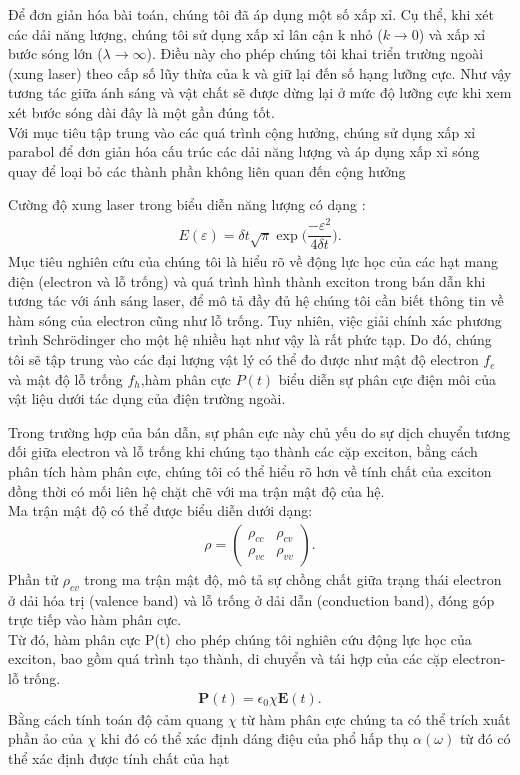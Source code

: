 \documentclass[%
 reprint,
 amsmath,amssymb,
 aps,
]{revtex4-2}
\begin{document}
Để đơn giản hóa bài toán, chúng tôi đã áp dụng một số xấp xỉ. Cụ thể, khi xét các dải năng lượng, chúng tôi sử dụng xấp xỉ lân cận k nhỏ ($k\rightarrow 0$) và xấp xỉ bước sóng lớn ($\lambda\rightarrow\infty$). Điều này cho phép chúng tôi khai triển trường ngoài (xung laser) theo cấp số lũy thừa của k và giữ lại đến số hạng lưỡng cực. Như vậy tương tác giữa ánh sáng và vật chất sẽ được dừng lại ở mức độ lưỡng cực khi xem xét bước sóng dài đây là một gần đúng tốt.\\
Với mục tiêu tập trung vào các quá trình cộng hưởng, chúng sử dụng xấp xỉ parabol để đơn giản hóa cấu trúc các dải năng lượng và áp dụng xấp xỉ sóng quay để loại bỏ các thành phần không liên quan đến cộng hưởng 

Cường độ xung laser trong biểu diễn năng lượng có dạng :
\begin{align}
	E(\varepsilon)=\delta t\sqrt{\pi}\exp{\bigg(\dfrac{-\varepsilon^2}{4\delta t}\bigg)}.
\end{align}
Mục tiêu nghiên cứu của chúng tôi là hiểu rõ về động lực học của các hạt mang điện (electron và lỗ trống) và quá trình hình thành exciton trong bán dẫn khi tương tác với ánh sáng laser, để mô tả đầy đủ hệ chúng tôi cần biết thông tin về hàm sóng của electron cũng như lỗ trống. Tuy nhiên, việc giải chính xác phương trình Schrödinger cho một hệ nhiều hạt như vậy là rất phức tạp. Do đó, chúng tôi sẽ tập trung vào các đại lượng vật lý có thể đo được như mật độ electron $f_e$ và mật độ lỗ trống $f_h$,hàm phân cực $P(t)$  biểu diễn sự phân cực điện môi của vật liệu dưới tác dụng của điện trường ngoài.

Trong trường hợp của bán dẫn, sự phân cực này chủ yếu do sự dịch chuyển tương đối giữa electron và lỗ trống khi chúng tạo thành các cặp exciton, bằng cách phân tích hàm phân cực, chúng tôi có thể hiểu rõ hơn về tính chất của exciton đồng thời có mối liên hệ chặt chẽ với ma trận mật độ của hệ.\\
Ma trận mật độ có thể được biểu diễn dưới dạng:
\begin{align*}
	\rho = \begin{pmatrix}
		\rho_{cc} & \rho_{cv} \\
		\rho_{vc} & \rho_{vv}
	\end{pmatrix} .
\end{align*}
Phần tử $\rho_{cv}$ trong ma trận mật độ, mô tả sự chồng chất giữa trạng thái electron ở dải hóa trị (valence band) và lỗ trống ở dải dẫn (conduction band), đóng góp trực tiếp vào hàm phân cực.\\
Từ đó, hàm phân cực P(t) cho phép chúng tôi nghiên cứu động lực học của exciton, bao gồm quá trình tạo thành, di chuyển và tái hợp của các cặp electron-lỗ trống. 
\begin{align}
	\mathbf{P}(t) = \epsilon_0 \chi \mathbf{E}(t).
\end{align}
Bằng cách tính toán độ cảm quang $\chi$ từ hàm phân cực chúng ta có thể trích xuất phần ảo của $\chi$ khi đó có thể xác định dáng điệu của phổ hấp thụ $\alpha{(\omega)}$ từ đó có thể xác định được tính chất của hạt
\end{document}
